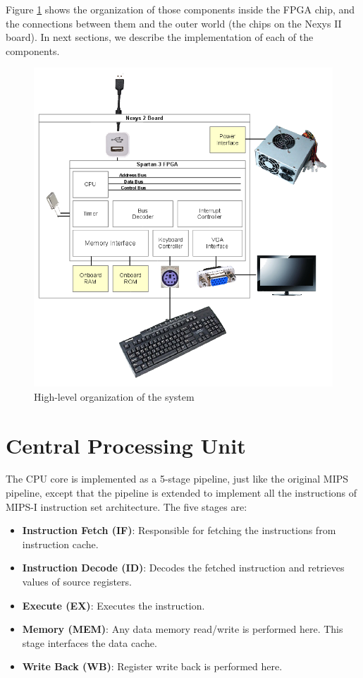 \documentclass[oneside]{book}
\begin{document}
Figure \ref{fpga} shows the organization of those components inside
the FPGA chip, and the connections between them and the outer
world (the chips on the Nexys II board). In next sections, we describe
the implementation of each of the components.

\begin{figure}[H]
\begin{center}
\includegraphics[width=\textwidth]{fpga.png}
\end{center}
\caption{High-level organization of the system}
\label{fpga}
\end{figure}

\newpage

\section {Central Processing Unit}

The CPU core is implemented as a 5-stage pipeline, just like the original
MIPS pipeline, except that the pipeline is extended to implement all the
instructions of MIPS-I instruction set architecture. The five stages are:

\begin{itemize}
\item \textbf{Instruction Fetch (IF)}:
      Responsible for fetching the instructions from instruction cache.
\item \textbf{Instruction Decode (ID)}: Decodes the fetched instruction
      and retrieves values of source registers.
\item \textbf{Execute (EX)}: Executes the instruction.
\item \textbf{Memory (MEM)}: Any data memory read/write is performed here. This
      stage interfaces the data cache.
\item \textbf{Write Back (WB)}: Register write back is performed here.
\end{itemize}
\end{document}
